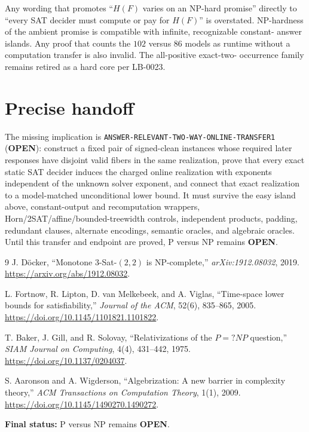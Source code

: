 \documentclass[11pt]{article}
\newcommand{\OPEN}{\textbf{OPEN}}
\begin{document}
Any wording that promotes ``$H(F)$ varies on an NP-hard promise'' directly to
``every SAT decider must compute or pay for $H(F)$'' is overstated.  NP-hardness
of the ambient promise is compatible with infinite, recognizable constant-
answer islands.  Any proof that counts the $102$ versus $86$ models as runtime
without a computation transfer is also invalid.  The all-positive exact-two-
occurrence family remains retired as a hard core per LB-0023.

\section{Precise handoff}

The missing implication is \texttt{ANSWER-RELEVANT-TWO-WAY-ONLINE-TRANSFER1}
(\OPEN): construct a fixed pair of signed-clean instances whose required
later responses have disjoint valid fibers in the same realization, prove
that every exact static SAT decider induces the charged online realization
with exponents independent of the unknown solver exponent, and connect that
exact realization to a model-matched unconditional lower bound.  It must
survive the easy island above, constant-output and recomputation wrappers,
Horn/2SAT/affine/bounded-treewidth controls, independent products, padding,
redundant clauses, alternate encodings, semantic oracles, and algebraic
oracles.  Until this transfer and endpoint are proved, P versus NP remains
\OPEN.

\begin{thebibliography}{9}
J. D\"ocker, ``Monotone 3-Sat-$(2,2)$ is NP-complete,''
\emph{arXiv:1912.08032}, 2019.  \url{https://arxiv.org/abs/1912.08032}.

L. Fortnow, R. Lipton, D. van Melkebeek, and A. Viglas,
``Time-space lower bounds for satisfiability,'' \emph{Journal of the ACM},
52(6), 835--865, 2005.  \url{https://doi.org/10.1145/1101821.1101822}.

T. Baker, J. Gill, and R. Solovay, ``Relativizations of the $P=?NP$
question,'' \emph{SIAM Journal on Computing}, 4(4), 431--442, 1975.
\url{https://doi.org/10.1137/0204037}.

S. Aaronson and A. Wigderson, ``Algebrization: A new barrier in complexity
theory,'' \emph{ACM Transactions on Computation Theory}, 1(1), 2009.
\url{https://doi.org/10.1145/1490270.1490272}.
\end{thebibliography}

\noindent\textbf{Final status:} P versus NP remains \OPEN.

\end{document}
